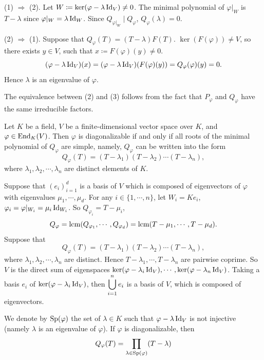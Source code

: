 \begin{proofenv}
    (1) $\Rightarrow$ (2). Let $W \coloneq \ker(\varphi - \lambda \operatorname{\mathrm{Id}}_{V}) \neq 0$.
    The minimal polynomial of $\varphi|_{W}$ is $T - \lambda$ since $\varphi|_{W} = \lambda \operatorname{\mathrm{Id}}_{W}$.
    Since $Q_{\varphi|_{W}} \mid Q_{\varphi}$, $Q_{\varphi}(\lambda) = 0$.

    \quad
    (2) $\Rightarrow$ (1). Suppose that $Q_{\varphi}(T) = (T - \lambda)F(T)$.
    $\ker(F(\varphi)) \neq V$, so there exists $y \in V$, such that $x \coloneq F(\varphi)(y) \neq 0$.
    $$(\varphi - \lambda \operatorname{\mathrm{Id}}_{V})(x) = (\varphi - \lambda \operatorname{\mathrm{Id}}_{V})(F(\varphi)(y)) = Q_{\varphi}(\varphi)(y) = 0.$$
    Hence $\lambda$ is an eigenvalue of $\varphi$.

    \quad The equivalence between (2) and (3) follows from the fact that $P_{\varphi}$ and $Q_{\varphi}$ have the same irreducible factors.
\end{proofenv}

\begin{theoremenv}
    Let $K$ be a field, $V$ be a finite-dimensional vector space over $K$,
    and $\varphi \in \operatorname{\mathrm{End}}_{K}(V)$.
    Then $\varphi$ is diagonalizable if and only if all roots of the minimal polynomial of $Q_\varphi$ are simple,
    namely, $Q_{\varphi}$ can be written into the form
    $$Q_{\varphi}(T) = (T - \lambda_1)(T - \lambda_2)\cdots(T - \lambda_n),$$
    where $\lambda_1, \lambda_2, \cdots, \lambda_n$ are distinct elements of $K$.
\end{theoremenv}
\begin{proofenv}
    Suppose that $(e_i)_{i=1}^d$ is a basis of $V$ which is composed of eigenvectors of $\varphi$ with eigenvalues $\mu_1,\cdots,\mu_d$.
    For any $i \in \{1,\cdots,n\}$, let $W_i = K e_i$, $\varphi_i = \varphi|_{W_i} = \mu_i \operatorname{\mathrm{Id}}_{W_i}$.
    So $Q_{\varphi_i} = T - \mu_i$,
    $$Q_{\varphi} = \operatorname{\mathrm{lcm}}(Q_{\varphi_1}, \cdots, Q_{\varphi_d}) = \operatorname{\mathrm{lcm}}(T-\mu_1, \cdots, T-\mu_d).$$
    Suppose that
    $$Q_{\varphi}(T) = (T - \lambda_1)(T - \lambda_2)\cdots(T - \lambda_n),$$
    where $\lambda_1, \lambda_2, \cdots, \lambda_n$ are distinct.
    Hence $T-\lambda_1,\cdots,T-\lambda_n$ are pairwise coprime.
    So $V$ is the direct sum of eigenspaces $\ker(\varphi - \lambda_i \operatorname{\mathrm{Id}}_{V}),\cdots,\ker(\varphi - \lambda_n \operatorname{\mathrm{Id}}_{V})$.
    Taking a basis $e_i$ of $\ker(\varphi - \lambda_i \operatorname{\mathrm{Id}}_{V})$,
    then $\displaystyle \bigcup_{i=1}^{n}e_i$ is a basis of $V$,
    which is composed of eigenvectors.
\end{proofenv}

\begin{remark}
    We denote by $\operatorname{\mathrm{Sp}}(\varphi)$ the set of $\lambda \in K$ such that $\varphi - \lambda \operatorname{\mathrm{Id}}_{V}$ is not injective (namely $\lambda$ is an eigenvalue of $\varphi$).
    If $\varphi$ is diagonalizable, then
    $$Q_{\varphi} (T) = \prod_{\lambda \in \operatorname{\mathrm{Sp}}(\varphi)} (T - \lambda)$$
\end{remark}


